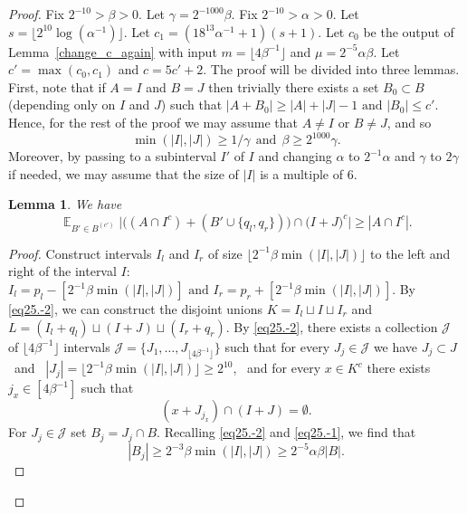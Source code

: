 \documentclass[12pt,reqno]{amsart}
\DeclareMathOperator*{\E}{\mathbb{E}}
\newtheorem{lemma}[theorem]{Lemma}
\theoremstyle{definition}
\renewcommand\leq{\leqslant}
\renewcommand\geq{\geqslant}
\renewcommand\ge{\geqslant}
\begin{document}
\begin{proof}
Fix $2^{-10}>\beta>0$. Let $\gamma=2^{-1000}\beta$. Fix $2^{-10}>\alpha>0$. Let $s=\lfloor 2^{10} \log (\alpha^{-1})\rfloor$. Let $c_1=(18^{13}\alpha^{-1}+1)(s+1)$. Let $c_0$ be the output of Lemma~\ref{change_c_again} with input $m=\lfloor 4\beta^{-1}\rfloor$ and $\mu=2^{-5}\alpha \beta$.  Let $c'=\max(c_0,c_1)$ and $c=5c'+2$. The proof will be divided into three lemmas.\\

First, note that if $A=I$ and $B=J$ then trivially there exists a set $B_0 \subset B$ (depending only on $I$ and $J$) such that
$|A+B_0| \geq |A|+|J|-1 \text{ and } |B_0| \leq c'$.
Hence, for the rest of the proof we may assume that $A \neq I$ or $B \neq J$, and so
\begin{equation}\label{eq25.0}
\min(|I|,|J|) \ge 1/\gamma \ \ \text{and} \ \ \beta \ge 2^{1000} \gamma.
\end{equation}
Moreover,  by passing to a subinterval $I'$ of $I$ and changing $\alpha$ to $2^{-1}\alpha$ and $\gamma$ to $2\gamma$ if needed, we may assume that the size of $|I|$ is a multiple of $6$.

\begin{lemma}\label{lem27}
We have
\begin{equation*}\label{eq25.01}
    \E_{B'\in B^{(c')}}\bigg|\bigg((A\cap I^c)+(B'\cup \{q_l,q_r\})\bigg)\cap \bigg(I+J\bigg)^c\bigg|\geq |A\cap I^c|.
\end{equation*}
\end{lemma}
\begin{proof}
Construct intervals $I_l$ and $I_r$ of size $\lfloor 2^{-1}\beta \min(|I|,|J|)  \rfloor$ to the left and right of the interval $I$: \ $I_l=p_l-[ 2^{-1}\beta \min(|I|,|J|) ] \text{ and } I_r= p_r+[ 2^{-1}\beta \min(|I|,|J|) ]$.
By \eqref{eq25.-2}, we can construct the disjoint unions
$K=I_l\sqcup I \sqcup I_r$
and $L=(I_l+q_l)\sqcup (I+J) \sqcup (I_r+q_r)$.
By \eqref{eq25.-2}, there exists a collection $\mathcal{J}$ of $\lfloor 4\beta^{-1} \rfloor$ intervals
$\mathcal{J}=\{J_1, \hdots, J_{\lfloor 4\beta^{-1} \rfloor}\}$
such that for every $J_j\in {\mathcal J}$ we have $J_j\subset J$ \ and \  $|J_j|= \lfloor 2^{-1}\beta \min(|I|,|J|)  \rfloor \geq 2^{10}$, \
and for every $x \in K^c$ there exists $j_x \in [ 4\beta^{-1}]$ such that
\begin{equation}\label{eq25.5}
(x+J_{j_x})\cap (I+J)=\emptyset.
\end{equation}
For $J_j \in {\mathcal J}$ set $B_j=J_j\cap B$.
Recalling \eqref{eq25.-2} and \eqref{eq25.-1}, we find that
\begin{equation}\label{eq25.55}
|B_j|\geq 2^{-3}\beta \min(|I|,|J|) \geq 2^{-5}\alpha \beta |B|.
\end{equation}


\end{proof}
\end{proof}
\end{document}
